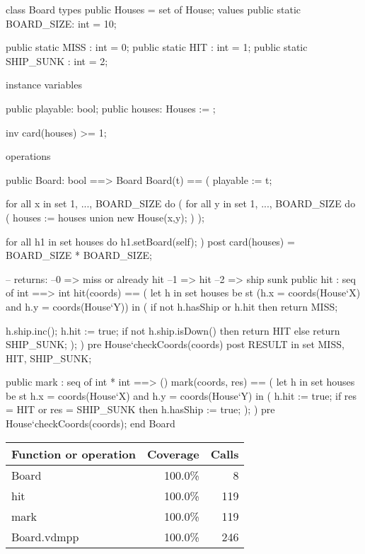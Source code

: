 \begin{vdm_al}
class Board
 types
  public Houses = set of House;
 values
  public static BOARD_SIZE: int = 10;
  
  public static MISS : int = 0;
  public static HIT : int = 1;
  public static SHIP_SUNK : int = 2;
 
 instance variables
  
  public playable: bool;
  public houses: Houses := {};
  
  inv card(houses) >= 1;
  
 operations
 
  public Board: bool ==> Board
   Board(t) == 
   (
    playable := t;
    
    for all x in set {1, ..., BOARD_SIZE}  do (
     for all y in set {1, ..., BOARD_SIZE} do (
      houses := houses union {new House(x,y)};
     )
    );
    
    for all h1 in set houses do h1.setBoard(self);
   )
  post card(houses) = BOARD_SIZE * BOARD_SIZE;
  
  -- returns:
  --0 => miss or already hit
  --1 => hit
  --2 => ship sunk
  public hit : seq of int ==> int
   hit(coords) ==
   (
    let h in set houses be st (h.x = coords(House`X) and h.y = coords(House`Y)) in (
     if not h.hasShip or h.hit then return MISS;

     h.ship.inc();
     h.hit := true;
     if not h.ship.isDown() then return HIT
     else return SHIP_SUNK;
    );
   )
   pre House`checkCoords(coords)   
   post RESULT in set {MISS, HIT, SHIP_SUNK};

  public mark : seq of int * int ==> ()
   mark(coords, res) ==
   (
    let h in set houses be st h.x = coords(House`X) and h.y = coords(House`Y) in (
     h.hit := true;
     if res = HIT or res = SHIP_SUNK then
      h.hasShip := true;
    );
   )
   pre House`checkCoords(coords);       
end Board
\end{vdm_al}
\bigskip
\begin{longtable}{|l|r|r|}
\hline
Function or operation & Coverage & Calls \\
\hline
\hline
Board & 100.0\% & 8 \\
\hline
hit & 100.0\% & 119 \\
\hline
mark & 100.0\% & 119 \\
\hline
\hline
Board.vdmpp & 100.0\% & 246 \\
\hline
\end{longtable}

